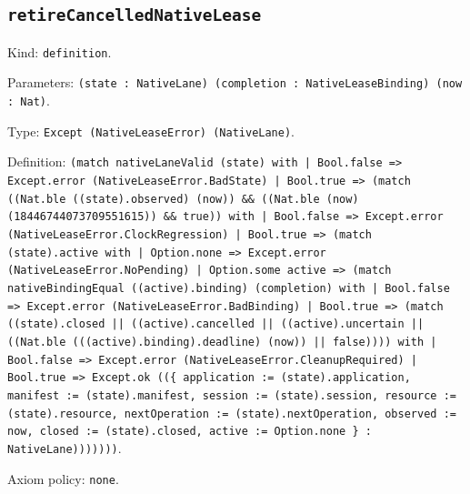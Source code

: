 \documentclass[11pt]{article}
\begin{document}
\subsection*{\texttt{retireCancelledNativeLease}}
\noindent Kind: \texttt{definition}.\par
\noindent Parameters: \texttt{(state : NativeLane) (completion : NativeLeaseBinding) (now : Nat)}.\par
\noindent Type: \texttt{Except (NativeLeaseError) (NativeLane)}.\par
\noindent Definition: \texttt{(match nativeLaneValid (state) with | Bool.false => Except.error (NativeLeaseError.BadState) | Bool.true => (match ((Nat.ble ((state).observed) (now)) \&\& ((Nat.ble (now) (18446744073709551615)) \&\& true)) with | Bool.false => Except.error (NativeLeaseError.ClockRegression) | Bool.true => (match (state).active with | Option.none => Except.error (NativeLeaseError.NoPending) | Option.some active => (match nativeBindingEqual ((active).binding) (completion) with | Bool.false => Except.error (NativeLeaseError.BadBinding) | Bool.true => (match ((state).closed || ((active).cancelled || ((active).uncertain || ((Nat.ble (((active).binding).deadline) (now)) || false)))) with | Bool.false => Except.error (NativeLeaseError.CleanupRequired) | Bool.true => Except.ok ((\{ application := (state).application, manifest := (state).manifest, session := (state).session, resource := (state).resource, nextOperation := (state).nextOperation, observed := now, closed := (state).closed, active := Option.none \} : NativeLane)))))))}.\par
\noindent Axiom policy: \texttt{none}.\par
\end{document}
